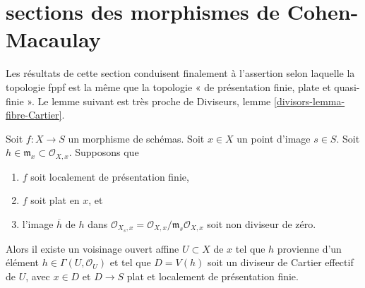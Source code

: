 \section{sections des morphismes de Cohen-Macaulay}
\label{section-slicing-CM}

\noindent
Les résultats de cette section conduisent finalement à l'assertion selon laquelle
la topologie fppf est la même que la topologie
« de présentation finie, plate et quasi-finie ».
Le lemme suivant est très proche de
Diviseurs, lemme \ref{divisors-lemma-fibre-Cartier}.

\begin{lemma}
\label{lemma-slice-given-element}
Soit $f : X \to S$ un morphisme de schémas.
Soit $x \in X$ un point d'image $s \in S$.
Soit $h \in \mathfrak m_x \subset \mathcal{O}_{X, x}$.
Supposons que
\begin{enumerate}
\item $f$ soit localement de présentation finie,
\item $f$ soit plat en $x$, et
\item l'image $\overline{h}$ de $h$ dans
$\mathcal{O}_{X_s, x} = \mathcal{O}_{X, x}/\mathfrak m_s\mathcal{O}_{X, x}$
soit non diviseur de zéro.
\end{enumerate}
Alors il existe un voisinage ouvert affine $U \subset X$ de $x$
tel que $h$ provienne d'un élément $h \in \Gamma(U, \mathcal{O}_U)$ et
tel que $D = V(h)$ soit un diviseur de Cartier effectif de $U$, avec $x \in D$ et
$D \to S$ plat et localement de présentation finie.
\end{lemma}

